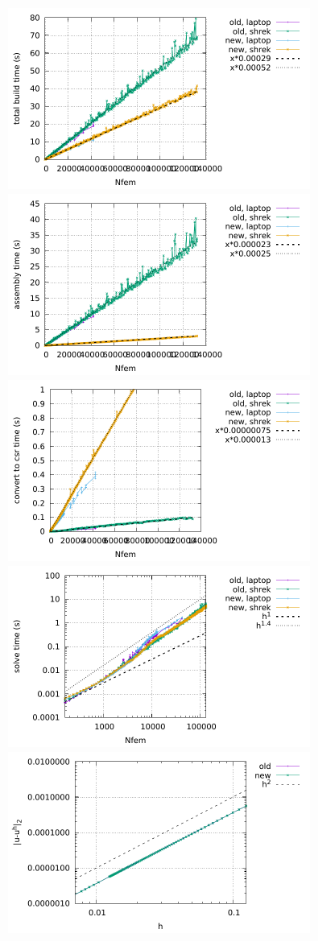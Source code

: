 \begin{center}
\includegraphics[width=8cm]{python_codes/fieldstone_176/results/build.pdf}
\includegraphics[width=8cm]{python_codes/fieldstone_176/results/assembly.pdf}\\
\includegraphics[width=8cm]{python_codes/fieldstone_176/results/convert2csr.pdf}
\includegraphics[width=8cm]{python_codes/fieldstone_176/results/solve.pdf}\\
\includegraphics[width=8cm]{python_codes/fieldstone_176/results/errv.pdf}

\end{center}
